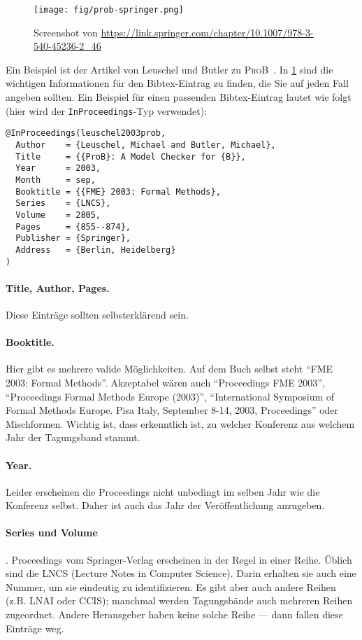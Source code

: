 \begin{figure}
    \centering
    \texttt{[image: fig/prob-springer.png]}
    \caption[Screenshot von \url{https://link.springer.com}]{
      Screenshot von \url{https://link.springer.com/chapter/10.1007/978-3-540-45236-2_46}}%
    \label{fig:prob-springer}
\end{figure}

Ein Beispiel ist der Artikel von Leuschel und Butler zu \textsc{ProB}~\cite{leuschel2003prob}.
In \cref{fig:prob-springer} sind die wichtigen Informationen für den Bibtex-Eintrag zu finden,
die Sie auf jeden Fall angeben sollten.
Ein Beispiel für einen passenden Bibtex-Eintrag lautet wie folgt (hier wird der \verb|InProceedings|-Typ verwendet):

\begin{verbatim}
@InProceedings(leuschel2003prob,
  Author	= {Leuschel, Michael and Butler, Michael},
  Title		= {{ProB}: A Model Checker for {B}},
  Year		= 2003,
  Month		= sep,
  Booktitle	= {{FME} 2003: Formal Methods},
  Series	= {LNCS},
  Volume	= 2805,
  Pages		= {855--874},
  Publisher	= {Springer},
  Address	= {Berlin, Heidelberg}
)
\end{verbatim}

\paragraph{Title, Author, Pages.} Diese Einträge sollten selbsterklärend sein.
\paragraph{Booktitle.} Hier gibt es mehrere valide Möglichkeiten.
Auf dem Buch selbst steht \enquote{FME 2003: Formal Methods}.
Akzeptabel wären auch \enquote{Proceedings FME 2003},
\enquote{Proceedings Formal Methods Europe (2003)},
\enquote{International Symposium of Formal Methods Europe. Pisa Italy, September 8-14, 2003, Proceedings}
oder Mischformen.
Wichtig ist, dass erkenntlich ist, zu welcher Konferenz aus welchem Jahr der Tagungsband stammt.
\paragraph{Year.} Leider erscheinen die Proceedings nicht unbedingt im selben Jahr wie die Konferenz selbst.
Daher ist auch das Jahr der Veröffentlichung anzugeben.
\paragraph{Series und Volume}. Proceedings vom Springer-Verlag erscheinen in der Regel in einer Reihe.
Üblich sind die LNCS (Lecture Notes in Computer Science). Darin erhalten sie auch eine Nummer, um sie eindeutig zu identifizieren.
Es gibt aber auch andere Reihen (z.B. LNAI oder CCIS); manchmal werden Tagungsbände auch mehreren Reihen zugeordnet.
Andere Herausgeber haben keine solche Reihe --- dann fallen diese Einträge weg.
